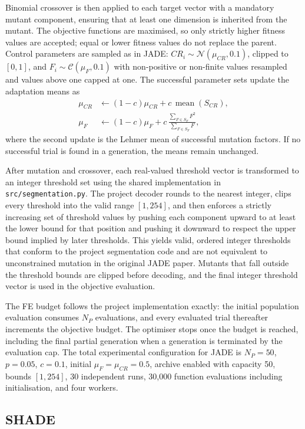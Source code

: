 \documentclass[review]{elsarticle}
\begin{document}
Binomial crossover is then applied to each target vector with a mandatory mutant component, ensuring that at least one dimension is inherited from the mutant. The objective functions are maximised, so only strictly higher fitness values are accepted; equal or lower fitness values do not replace the parent. Control parameters are sampled as in JADE: $CR_i \sim \mathcal{N}(\mu_{CR}, 0.1)$, clipped to $[0,1]$, and $F_i \sim \mathcal{C}(\mu_F, 0.1)$ with non-positive or non-finite values resampled and values above one capped at one. The successful parameter sets update the adaptation means as
\begin{align}
\mu_{CR} &\leftarrow
(1-c)\mu_{CR}+c\,\operatorname{mean}(S_{CR}),\\
\mu_F &\leftarrow
(1-c)\mu_F+
 c\,\frac{\sum_{F\in S_F}F^2}{\sum_{F\in S_F}F},
\end{align}
where the second update is the Lehmer mean of successful mutation factors. If no successful trial is found in a generation, the means remain unchanged.

After mutation and crossover, each real-valued threshold vector is transformed to an integer threshold set using the shared implementation in \texttt{src/segmentation.py}. The project decoder rounds to the nearest integer, clips every threshold into the valid range $[1,254]$, and then enforces a strictly increasing set of threshold values by pushing each component upward to at least the lower bound for that position and pushing it downward to respect the upper bound implied by later thresholds. This yields valid, ordered integer thresholds that conform to the project segmentation code and are not equivalent to unconstrained mutation in the original JADE paper. Mutants that fall outside the threshold bounds are clipped before decoding, and the final integer threshold vector is used in the objective evaluation.

The FE budget follows the project implementation exactly: the initial population evaluation consumes $N_P$ evaluations, and every evaluated trial thereafter increments the objective budget. The optimiser stops once the budget is reached, including the final partial generation when a generation is terminated by the evaluation cap. The total experimental configuration for JADE is $N_P=50$, $p=0.05$, $c=0.1$, initial $\mu_F=\mu_{CR}=0.5$, archive enabled with capacity 50, bounds $[1,254]$, 30 independent runs, 30,000 function evaluations including initialisation, and four workers.

\subsection{SHADE}
\end{document}
